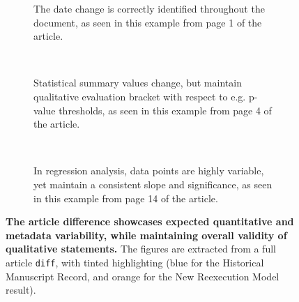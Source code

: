 \begin{figure*}
	\centering
	\begin{subfigure}{0.99\textwidth}
		\centering
		\caption{
			The date change is correctly identified throughout the document, as seen in this example from page 1 of the article.
		}
		\label{fig:diff_date}
	\end{subfigure}
	\\
	\begin{subfigure}{0.99\textwidth}
		\centering
		\caption{
			Statistical summary values change, but maintain qualitative evaluation bracket with respect to e.g. p-value thresholds, as seen in this example from page 4 of the article.
		}
		\label{fig:diff_text}
	\end{subfigure}
	\\
	\vspace{1em}
	\begin{subfigure}{0.99\textwidth}
		\centering
		\caption{
			In regression analysis, data points are highly variable, yet maintain a consistent slope and significance, as seen in this example from page 14 of the article.
		}
		\label{fig:diff_fig}
	\end{subfigure}
	\caption{
		\textbf{The article difference showcases expected quantitative and metadata variability, while maintaining overall validity of qualitative statements.}
		The figures are extracted from a full article \texttt{diff}, with tinted highlighting (blue for the Historical Manuscript Record, and orange for the New Reexecution Model result).
	}
	\label{fig:diff}
\end{figure*}

